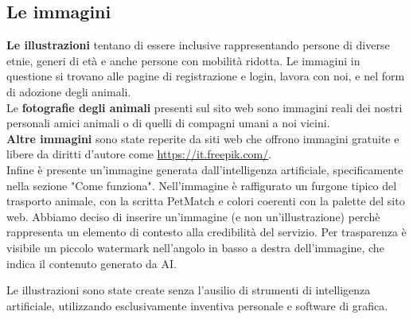 \subsection{Le immagini}
\textbf{Le illustrazioni} tentano di essere inclusive rappresentando persone di diverse etnie, generi di età e anche persone con mobilità ridotta. Le immagini in questione si trovano alle pagine di registrazione e login, lavora con noi, e nel form di adozione degli animali.\\
Le \textbf{fotografie degli animali} presenti sul sito web sono immagini reali dei nostri personali amici animali o di quelli di compagni umani a noi vicini.\\
\textbf{Altre immagini} sono state reperite da siti web che offrono immagini gratuite e libere da diritti d'autore come \url{https://it.freepik.com/}. \\
Infine è presente un'immagine generata dall'intelligenza artificiale, specificamente nella sezione "Come funziona". Nell'immagine è raffigurato un furgone tipico del trasporto animale, con la scritta PetMatch e colori coerenti con la palette del sito web. Abbiamo deciso di inserire un'immagine (e non un'illustrazione) perchè rappresenta un elemento di contesto alla credibilità del servizio. Per trasparenza è visibile un piccolo watermark nell'angolo in basso a destra dell'immagine, che indica il contenuto generato da AI.\\
\begin{mdframed}[
    backgroundcolor=gray!15,
    linecolor=none,
    leftmargin=-3cm,
    rightmargin=-3cm,
    innerleftmargin=4cm,
    innerrightmargin=4cm,
    innertopmargin=10pt,
    innerbottommargin=10pt
]
\textmd{Le illustrazioni sono state create senza l'ausilio di strumenti di intelligenza artificiale, utilizzando esclusivamente inventiva personale e software di grafica.}
\end{mdframed}
